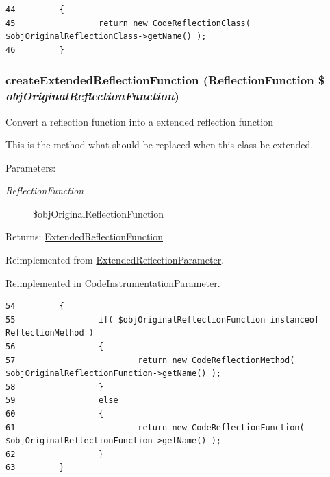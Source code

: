 \begin{Code}\begin{verbatim}44         {
45                 return new CodeReflectionClass( $objOriginalReflectionClass->getName() );
46         }
\end{verbatim}
\end{Code}


\hypertarget{class_code_reflection_parameter_b23ad87d3ac2f376c1a133ca6d27f031}{
\subsubsection[{createExtendedReflectionFunction}]{\setlength{\rightskip}{0pt plus 5cm}createExtendedReflectionFunction (ReflectionFunction \$ {\em objOriginalReflectionFunction})}}
\label{class_code_reflection_parameter_b23ad87d3ac2f376c1a133ca6d27f031}


Convert a reflection function into a extended reflection function

This is the method what should be replaced when this class be extended.

\begin{Desc}
\item[Parameters:]
\begin{description}
\item[{\em ReflectionFunction}]\$objOriginalReflectionFunction \end{description}
\end{Desc}
\begin{Desc}
\item[Returns:]\hyperlink{class_extended_reflection_function}{ExtendedReflectionFunction} \end{Desc}


Reimplemented from \hyperlink{class_extended_reflection_parameter_b23ad87d3ac2f376c1a133ca6d27f031}{ExtendedReflectionParameter}.

Reimplemented in \hyperlink{class_code_instrumentation_parameter_b23ad87d3ac2f376c1a133ca6d27f031}{CodeInstrumentationParameter}.

\begin{Code}\begin{verbatim}54         {
55                 if( $objOriginalReflectionFunction instanceof ReflectionMethod )
56                 {
57                         return new CodeReflectionMethod( $objOriginalReflectionFunction->getName() );
58                 }
59                 else
60                 {
61                         return new CodeReflectionFunction( $objOriginalReflectionFunction->getName() );
62                 }
63         }
\end{verbatim}
\end{Code}


